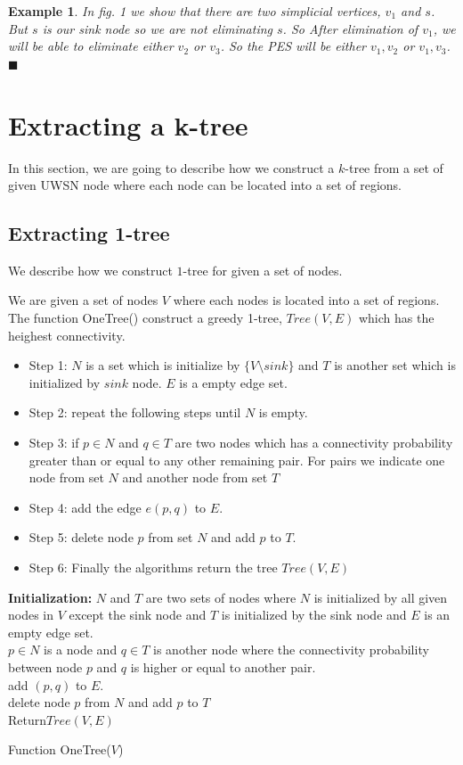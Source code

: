 \documentclass[12pt]{article}
\newtheorem{exmp}{Example}[section]
\begin{document}
\begin{exmp}
\normalfont
In fig. 1 we show that there are two simplicial vertices, $v_1$ and $s$. But $s$ is our sink node so we are not eliminating $s$. So After elimination of $v_1$, we will be able to eliminate either $v_2$ or $v_3$. So the PES will be either $v_1,v_2$ or $v_1,v_3$.$\blacksquare$
\end{exmp}
\section{Extracting a k-tree}
In this section, we are going to describe how we construct a $k$-tree from a set of given UWSN node where each node can be located into a set of regions.
\subsection{Extracting 1-tree}
We describe how we construct $1$-tree for given a set of nodes.

We are given a set of nodes $V$ where each nodes is located into a set of regions. The function OneTree() construct a greedy 1-tree, $Tree(V,E)$ which has the heighest connectivity.
\begin{itemize}[noitemsep]
\item Step 1: $N$ is a set which is initialize by $\{V\setminus sink\}$ and $T$ is another set which is initialized by $sink$ node. $E$ is a empty edge set.
\item Step 2: repeat the following steps until $N$ is empty.
\item Step 3: if $p\in N$ and $q\in T$ are two nodes which has a connectivity probability greater than or equal to any other remaining pair. For pairs we indicate one node from set $N$ and another node from set $T$
\item Step 4: add the edge $e(p,q)$ to $E$.
\item  Step 5: delete node $p$ from set $N$ and add $p$ to $T$. 
\item  Step 6: Finally the algorithms return the tree $Tree(V,E)$
\end{itemize}
 
\begin{algorithm}

\nl \textbf{Initialization: } $N$ and $T$ are two sets of nodes where $N$ is initialized by all given nodes in $V$ except the sink node and $T$ is initialized by the sink node and $E$ is an empty edge set.\\
\nl {}
{
\nl $p\in N$ is a node and $q\in T$ is another node where  the connectivity probability between node $p$ and $q$ is higher or equal to another pair.\\
\nl add $(p,q)$ to $E$.\\
\nl delete node $p$ from $N$ and add $p$ to $T$\\
}
\nl Return{$Tree(V,E)$}
\caption{Function OneTree($V$)}
\end{algorithm}
\end{document}
